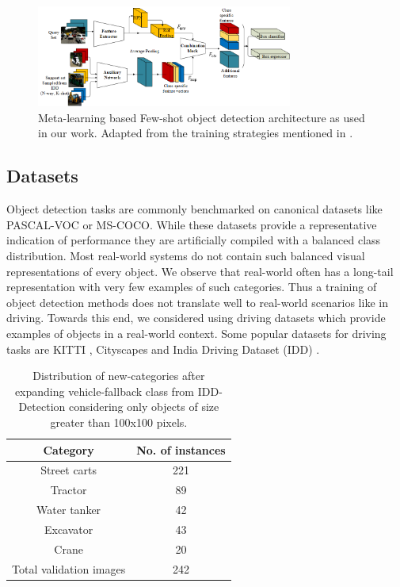 \documentclass[letterpaper]{article} %
\begin{document}
\begin{figure}[t]
      \centering
      \includegraphics[width=0.75\textwidth,keepaspectratio]{aux_net}
      \caption{Meta-learning based Few-shot object detection architecture as used in our work. Adapted from the training strategies mentioned in \cite{metarcnn,addfeat}.}
      \label{fig_aux}
\end{figure}

\subsection{Datasets}
\label{approach:data}
Object detection tasks are commonly benchmarked on canonical datasets like PASCAL-VOC or MS-COCO. While these datasets provide a representative indication of performance they are artificially compiled with a balanced class distribution. Most real-world systems do not contain such balanced visual representations of every object.  We observe that real-world often has a long-tail representation with very few examples of such categories. Thus a training of object detection methods does not translate well to real-world scenarios like in driving. Towards this end, we considered  using driving datasets which provide examples of objects in a real-world context. Some popular datasets for driving tasks are KITTI \cite{kitti}, Cityscapes \cite{city} and India Driving Dataset (IDD) \cite{idd}.

\begin{table} [t]
    \caption{Distribution of new-categories after expanding vehicle-fallback class from IDD-Detection considering only objects of size greater than 100x100 pixels.}
    \centering
    \begin{tabular}{ c | c}
          \hline
          Category          & No. of instances \\
          \hline
          Street carts      & 221 \\
          Tractor           & 89 \\
          Water tanker      & 42 \\
          Excavator         & 43 \\
          Crane             & 20 \\
          \hline
          Total validation images &242\footnotemark\\
          \hline
    \end{tabular}
    \label{tableI}
\end{table}
\end{document}
